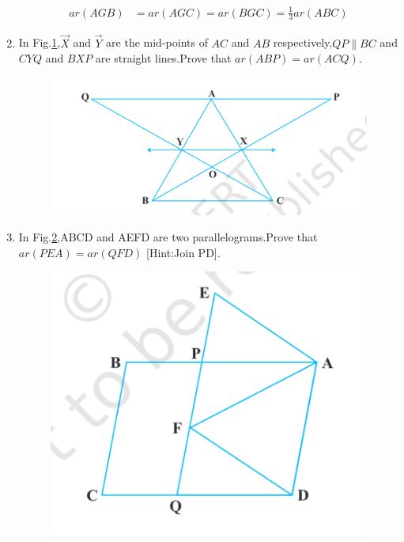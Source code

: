 \begin{enumerate}[label=\thesection.\arabic*,ref=\thesection.\theenumi]
	\begin{align} 
		{ar (AGB)} &={ar (AGC)}= {ar (BGC)} = \frac{1}{3} {ar (ABC)}
	\end{align}
\item In Fig.\ref{fig:exemplar/9.9.4/9.26},$\vec{X}$ and $\vec{Y}$ are the mid-points of $AC$ and $AB$ respectively,$QP \parallel BC$ and $CYQ$ and $BXP$ are straight lines.Prove that $ ar (ABP) = ar (ACQ) $.
\begin{figure}[h]
	\centering
	\includegraphics[width=\columnwidth]{exemplar/9.9.4/figs/Fig9.26.png}
	\caption{}
	\label{fig:exemplar/9.9.4/9.26}
\end{figure}
\item In Fig.\ref{fig:exemplar/9.9.4/9.27},ABCD and AEFD are two parallelograms.Prove that $ ar (PEA) = ar (QFD) $ [Hint:Join PD].
\begin{figure}[h]
	\centering
	\includegraphics[width=\columnwidth]{exemplar/9.9.4/figs/Fig9.27.png}
	\caption{}
	\label{fig:exemplar/9.9.4/9.27}

\end{figure}
\end{enumerate}

